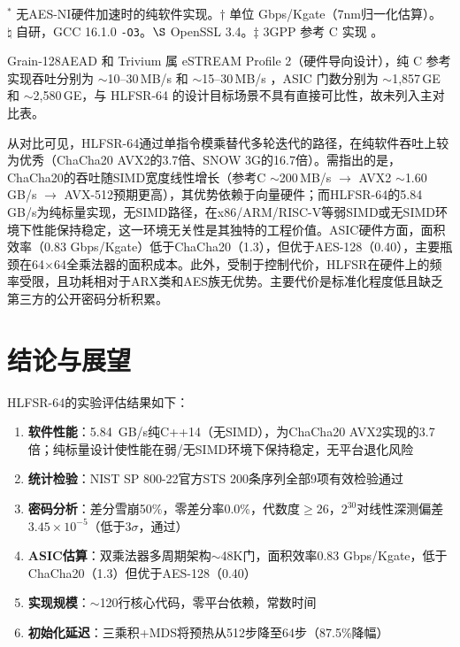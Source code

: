\documentclass[11pt,a4paper]{ctexart}
\begin{document}
\smallskip
{\footnotesize $^*$ 无AES-NI硬件加速时的纯软件实现。$\dagger$ 单位 Gbps/Kgate（7nm归一化估算）。\\
$\natural$ 自研，GCC 16.1.0 \texttt{-O3}。$\S$ OpenSSL 3.4。$\ddag$ 3GPP 参考 C 实现 \cite{etsi-snow}。}

{\footnotesize Grain-128AEAD 和 Trivium \cite{grain,trivium} 属 eSTREAM Profile 2（硬件导向设计），纯 C 参考实现吞吐分别为 $\sim$10--30\,MB/s 和 $\sim$15--30\,MB/s \cite{grain,trivium}，ASIC 门数分别为 $\sim$1,857\,GE 和 $\sim$2,580\,GE，与 HLFSR-64 的设计目标场景不具有直接可比性，故未列入主对比表。}

从对比可见，HLFSR-64通过单指令模乘替代多轮迭代的路径，在纯软件吞吐上较为优秀（ChaCha20 AVX2的3.7倍、SNOW 3G的16.7倍）。需指出的是，ChaCha20的吞吐随SIMD宽度线性增长（参考C $\sim$200\,MB/s $\rightarrow$ AVX2 $\sim$1.60\,GB/s $\rightarrow$ AVX-512预期更高），其优势依赖于向量硬件；而HLFSR-64的5.84\,GB/s为纯标量实现，无SIMD路径，在x86/ARM/RISC-V等弱SIMD或无SIMD环境下性能保持稳定，这一环境无关性是其独特的工程价值。ASIC硬件方面，面积效率（0.83 Gbps/Kgate）低于ChaCha20（1.3），但优于AES-128（0.40），主要瓶颈在64$\times$64全乘法器的面积成本。此外，受制于控制代价，HLFSR在硬件上的频率受限，且功耗相对于ARX类和AES族无优势。主要代价是标准化程度低且缺乏第三方的公开密码分析积累。

\clearpage
\section{结论与展望}

HLFSR-64的实验评估结果如下：

\begin{enumerate}
\item \textbf{软件性能}：5.84~GB/s纯C++14（无SIMD），为ChaCha20 AVX2实现的3.7倍；纯标量设计使性能在弱/无SIMD环境下保持稳定，无平台退化风险
\item \textbf{统计检验}：NIST SP 800-22官方STS 200条序列全部9项有效检验通过
\item \textbf{密码分析}：差分雪崩50\%，零差分率0.0\%，代数度$\ge 26$，$2^{30}$对线性深测偏差$3.45\times10^{-5}$（低于$3\sigma$，通过）
\item \textbf{ASIC估算}：双乘法器多周期架构$\sim$48K门，面积效率0.83 Gbps/Kgate，低于ChaCha20（1.3）但优于AES-128（0.40）
\item \textbf{实现规模}：$\sim$120行核心代码，零平台依赖，常数时间
\item \textbf{初始化延迟}：三乘积+MDS将预热从512步降至64步（87.5\%降幅）
\end{enumerate}
\end{document}
